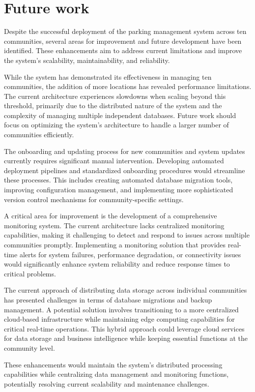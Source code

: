 \chapter{Future work}\label{ch:future_work}

Despite the successful deployment of the parking management system across ten communities, several areas for improvement and future development have been identified. These enhancements aim to address current limitations and improve the system's scalability, maintainability, and reliability. 

While the system has demonstrated its effectiveness in managing ten communities, the addition of more locations has revealed performance limitations. The current architecture experiences slowdowns when scaling beyond this threshold, primarily due to the distributed nature of the system and the complexity of managing multiple independent databases. Future work should focus on optimizing the system's architecture to handle a larger number of communities efficiently.

The onboarding and updating process for new communities and system updates currently requires significant manual intervention. Developing automated deployment pipelines and standardized onboarding procedures would streamline these processes. This includes creating automated database migration tools, improving configuration management, and implementing more sophisticated version control mechanisms for community-specific settings. 

A critical area for improvement is the development of a comprehensive monitoring system. The current architecture lacks centralized monitoring capabilities, making it challenging to detect and respond to issues across multiple communities promptly. Implementing a monitoring solution that provides real-time alerts for system failures, performance degradation, or connectivity issues would significantly enhance system reliability and reduce response times to critical problems.

The current approach of distributing data storage across individual communities has presented challenges in terms of database migrations and backup management. A potential solution involves transitioning to a more centralized cloud-based infrastructure while maintaining edge computing capabilities for critical real-time operations. This hybrid approach could leverage cloud services for data storage and business intelligence while keeping essential functions at the community level.

These enhancements would maintain the system's distributed processing capabilities while centralizing data management and monitoring functions, potentially resolving current scalability and maintenance challenges.
